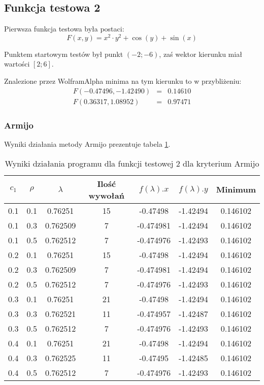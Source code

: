 \documentclass{classrep}
\begin{document}
\subsection{Funkcja testowa 2}
Pierwsza funkcja testowa była postaci:
\begin{equation}
 F(x, y) = x^2 \cdot y^2 + \cos(y) + \sin(x)
\end{equation}

Punktem startowym testów był punkt $(-2; -6)$, zaś wektor kierunku miał wartości $[2; 6]$.


Znalezione przez WolframAlpha minima na tym kierunku to w przybliżeniu:
\begin{eqnarray}
 F(-0.47496, -1.42490) & = & 0.14610 \\ 
 F( 0.36317,  1.08952) & = & 0.97471
\end{eqnarray}


\subsubsection{Armijo}

Wyniki działania metody Armijo prezentuje tabela \ref{armijo2}.

\begin{table}
  \centering
  \caption{Wyniki działania programu dla funkcji testowej 2 dla kryterium Armijo}
  \label{armijo2}
  \begin{tabular}{|c|c|c|c|c|c|c|}
    \hline
    $c_1$ & $\rho$ & $\lambda$ & Ilość wywołań & $f(\lambda).x$ & $f(\lambda).y$ & Minimum \\
    \hline
    0.1 & 0.1 & 0.76251 & 15 & -0.47498 & -1.42494 & 0.146102 \\
    0.1 & 0.3 & 0.762509 & 7 & -0.474981 & -1.42494 & 0.146102 \\
    0.1 & 0.5 & 0.762512 & 7 & -0.474976 & -1.42493 & 0.146102 \\
    0.2 & 0.1 & 0.76251 & 15 & -0.47498 & -1.42494 & 0.146102 \\
    0.2 & 0.3 & 0.762509 & 7 & -0.474981 & -1.42494 & 0.146102 \\
    0.2 & 0.5 & 0.762512 & 7 & -0.474976 & -1.42493 & 0.146102 \\
    0.3 & 0.1 & 0.76251 & 21 & -0.47498 & -1.42494 & 0.146102 \\
    0.3 & 0.3 & 0.762521 & 11 & -0.474957 & -1.42487 & 0.146102 \\
    0.3 & 0.5 & 0.762512 & 7 & -0.474976 & -1.42493 & 0.146102 \\
    0.4 & 0.1 & 0.76251 & 21 & -0.47498 & -1.42494 & 0.146102 \\
    0.4 & 0.3 & 0.762525 & 11 & -0.47495 & -1.42485 & 0.146102 \\
    0.4 & 0.5 & 0.762512 & 7 & -0.474976 & -1.42493 & 0.146102 \\
    \hline
  \end{tabular}
\end{table}
\end{document}
